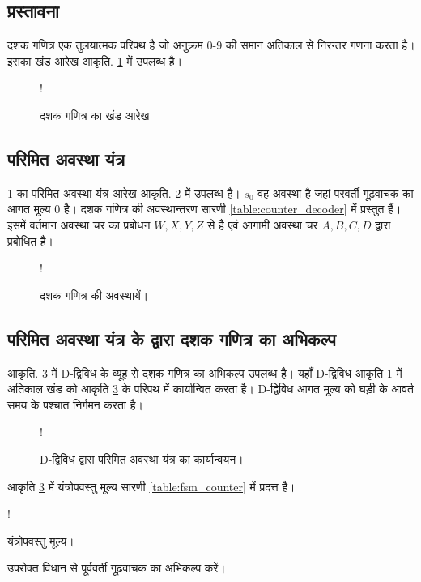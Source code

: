 \subsection{प्रस्तावना}
दशक गणित्र  एक  तुलयात्मक  परिपथ है जो अनुक्रम 0-9 की समान अतिकाल से निरन्तर   गणना करता है।  इसका खंड आरेख 
आकृति. \ref{fig:dec_counter} में उपलब्ध है।  

\begin{figure}[!h]
\resizebox {\columnwidth} {!} {

%
}
\caption{दशक गणित्र का खंड आरेख}
\label{fig:dec_counter}
\end{figure}
%
\subsection{परिमित अवस्था यंत्र}
%
\ref{fig:dec_counter} का परिमित अवस्था यंत्र आरेख आकृति. \ref{fig:fsm_counter} में उपलब्ध है।  $s_0$ वह अवस्था है जहां परवर्ती गूढ़वाचक का आगत मूल्य  0 है।  दशक गणित्र  की अवस्थान्तरण सारणी   \ref{table:counter_decoder}  में प्रस्तुत हैं।  इसमें वर्तमान अवस्था चर  का प्रबोधन  $W,X,Y,Z$ से है एवं आगामी अवस्था चर  $A,B,C,D$ द्वारा प्रबोधित है।
\begin{figure}[!h]
\centering
\resizebox {\columnwidth} {!} {

}
\caption{दशक गणित्र की अवस्थायें।}
\label{fig:fsm_counter}
\end{figure}
%
\subsection{परिमित अवस्था यंत्र के द्वारा दशक गणित्र का अभिकल्प}

 आकृति. \ref{fig:dff} में D-द्विविध के व्यूह से दशक गणित्र का अभिकल्प उपलब्ध है।  यहाँ D-द्विविध आकृति \ref{fig:dec_counter} में अतिकाल खंड को  आकृति \ref{fig:dff} के परिपथ में कार्यान्वित करता है। D-द्विविध आगत मूल्य को घड़ी के आवर्त समय के पश्चात निर्गमन
करता है।
\begin{figure}[!h]
\resizebox {\columnwidth} {!} {

}
\caption{D-द्विविध द्वारा परिमित अवस्था यंत्र का कार्यान्वयन।}
\label{fig:dff}
\end{figure}
%
आकृति \ref{fig:dff} में यंत्रोपवस्तु मूल्य  सारणी \ref{table:fsm_counter} में प्रदत्त है।
\begin{table}[!h]
\resizebox {\columnwidth} {!} {

}
\caption{यंत्रोपवस्तु मूल्य।}
\label{table:fsm_counter}
\end{table}

उपरोक्त विधान से पूर्ववर्ती गूढ़वाचक का अभिकल्प करें।





